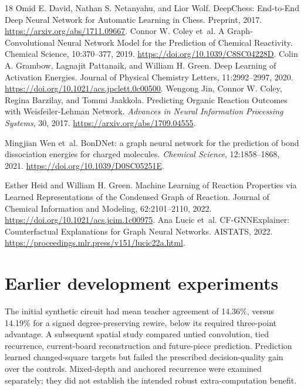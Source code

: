 \documentclass{article}
\begin{document}
\begin{thebibliography}{18}
Omid E. David, Nathan S. Netanyahu, and Lior Wolf. DeepChess: End-to-End Deep
Neural Network for Automatic Learning in Chess. Preprint, 2017.
\url{https://arxiv.org/abs/1711.09667}.
Connor W. Coley et~al. A Graph-Convolutional Neural Network Model for the
Prediction of Chemical Reactivity. Chemical Science, 10:370--377, 2019.
\url{https://doi.org/10.1039/C8SC04228D}.
Colin A. Grambow, Lagnajit Pattanaik, and William H. Green. Deep Learning of
Activation Energies. Journal of Physical Chemistry Letters, 11:2992--2997, 2020.
\url{https://doi.org/10.1021/acs.jpclett.0c00500}.
Wengong Jin, Connor W. Coley, Regina Barzilay, and Tommi Jaakkola.
Predicting Organic Reaction Outcomes with Weisfeiler-Lehman Network.
\emph{Advances in Neural Information Processing Systems}, 30, 2017.
\url{https://arxiv.org/abs/1709.04555}.

Mingjian Wen et~al. BonDNet: a graph neural network for the prediction of bond
dissociation energies for charged molecules. \emph{Chemical Science},
12:1858--1868, 2021. \url{https://doi.org/10.1039/D0SC05251E}.

Esther Heid and William H. Green. Machine Learning of Reaction Properties via
Learned Representations of the Condensed Graph of Reaction. Journal of Chemical
Information and Modeling, 62:2101--2110, 2022.
\url{https://doi.org/10.1021/acs.jcim.1c00975}.
Ana Lucic et~al. CF-GNNExplainer: Counterfactual Explanations for Graph Neural
Networks. AISTATS, 2022. \url{https://proceedings.mlr.press/v151/lucic22a.html}.
\end{thebibliography}
\endgroup

\appendix
\section{Earlier development experiments}
The initial synthetic circuit had mean teacher agreement of 14.36\%, versus
14.19\% for a signed degree-preserving rewire, below its required three-point
advantage. A subsequent spatial study compared untied convolution, tied
recurrence, current-board reconstruction and future-piece prediction. Prediction
learned changed-square targets but failed the prescribed decision-quality gain
over the controls. Mixed-depth and anchored recurrence were examined separately;
they did not establish the intended robust extra-computation benefit.
\end{document}
